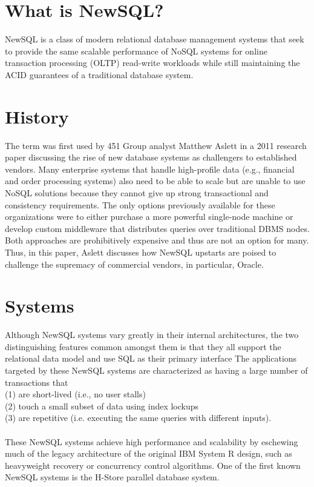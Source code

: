 \documentclass[12pt]{article}
\begin{document}
\tableofcontents
\pagebreak



\section{What is NewSQL?}
NewSQL is a class of modern relational database management systems that seek to provide the same scalable performance of NoSQL systems for online transaction processing (OLTP) read-write workloads while still maintaining the ACID guarantees of a traditional database system.
\section{History}
The term was first used by 451 Group analyst Matthew Aslett in a 2011 research paper discussing the rise of new database systems as challengers to established vendors. Many enterprise systems that handle high-profile data (e.g., financial and order processing systems) also need to be able to scale but are unable to use NoSQL solutions because they cannot give up strong transactional and consistency requirements. The only options previously available for these organizations were to either purchase a more powerful single-node machine or develop custom middleware that distributes queries over traditional DBMS nodes. Both approaches are prohibitively expensive and thus are not an option for many. Thus, in this paper, Aslett discusses how NewSQL upstarts are poised to challenge the supremacy of commercial vendors, in particular, Oracle.
\section{Systems}
Although NewSQL systems vary greatly in their internal architectures, the two distinguishing features common amongst them is that they all support the relational data model and use SQL as their primary interface The applications targeted by these NewSQL systems are characterized as having a large number of transactions that 
\\(1) are short-lived (i.e., no user stalls)
\\ (2) touch a small subset of data using index lockups
\\ (3) are repetitive (i.e. executing the same queries with different inputs).\\
\\These NewSQL systems achieve high performance and scalability by eschewing much of the legacy architecture of the original IBM System R design, such as heavyweight recovery or concurrency control algorithms. One of the first known NewSQL systems is the H-Store parallel database system.\\
\end{document}
